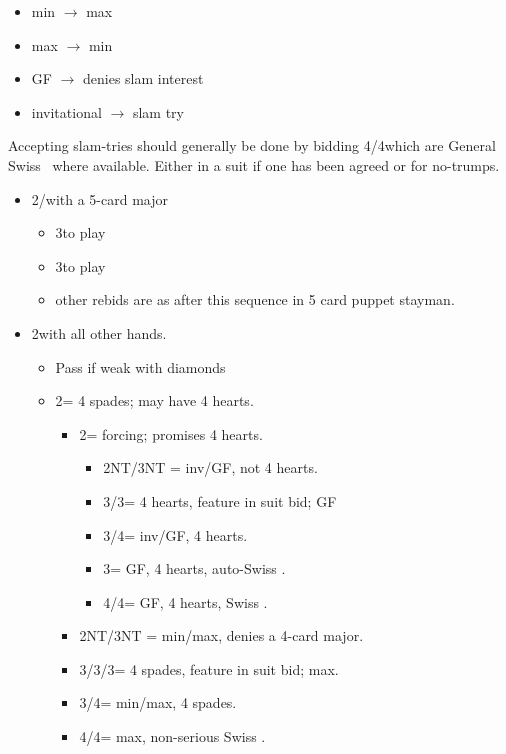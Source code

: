 \documentclass[a4paper,14pt]{extarticle}
\begin{document}
\begin{itemize}
\item min $\rightarrow$ max
\item max $\rightarrow$ min
\item GF $\rightarrow$ denies slam interest
\item invitational $\rightarrow$ slam try
\end{itemize}

Accepting slam-tries should generally be done by bidding
4\clubs/4\diamonds which are General Swiss~ where
available. Either in a suit if one has been agreed or for no-trumps.


	\begin{itemize}
	\item 2\hearts/\spades with a 5-card major
		\begin{itemize}
		\item 3\clubs to play
		\item 3\diamonds to play
		\item other rebids are as after this sequence in 5 card puppet stayman.
		\end{itemize}
	\item 2\diamonds with all other hands. 
		\begin{itemize}
		\item Pass if weak with diamonds
		\item 2\hearts = 4 spades; may have 4 hearts.
			\begin{itemize}
			\item 2\spades = forcing; promises 4 hearts.
				\begin{itemize}
				\item 2NT/3NT = inv/GF, not 4 hearts.
				\item 3\clubs/3\diamonds = 4 hearts, feature in suit bid; GF
				\item 3\hearts/4\hearts = inv/GF, 4 hearts.
				\item 3\spades = GF, 4 hearts, auto-Swiss .
				\item 4\clubs/4\diamonds = GF, 4 hearts, Swiss .
				\end{itemize}
			\item 2NT/3NT = min/max, denies a 4-card major.
			\item 3\clubs/3\diamonds/3\hearts = 4 spades, feature in suit bid; max.
			\item 3\spades/4\spades = min/max, 4 spades.
			\item 4\clubs/4\diamonds = max, non-serious Swiss .
			\end{itemize}


\end{itemize}
\end{itemize}
\end{document}
